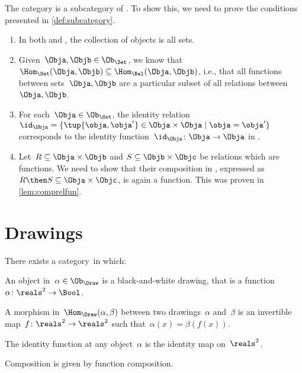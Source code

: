 \begin{example}
    The category \Set is a subcategory of \Rel. To show this, we need to prove the conditions presented in \cref{def:subcategory}.
    \begin{enumerate}
        \item In both \Rel and \Set, the collection of objects is all sets.
        \item Given~$\Obja,\Objb\in \Ob_{\Set}$, we know that~$\Hom_{\Set}(\Obja,\Objb)\subseteq \Hom_{\Rel}(\Obja,\Objb)$, i.e., that all functions between sets~$\Obja,\Objb$ are a particular subset of all relations between~$\Obja,\Objb$.
        \item For each~$\Obja \in \Ob_{\Set}$, the identity relation~$\id_\Obja=\{\tup{\obja,\obja'}\in \Obja\times \Obja \mid \obja=\obja'\}$ corresponds to the identity function~$\id_\Obja \colon \Obja \to \Obja$ in \Set.
        \item Let~$R\subseteq \Obja\times \Objb$ and $S\subseteq \Objb \times \Objc$ be relations which are functions. We need to show that their composition in \Rel, expressed as~$R\then S\subseteq \Obja\times \Objc$, is again a function. This was proven in \cref{lem:comprelfun}.
    \end{enumerate}

\end{example}


\section{Drawings}

\begin{definition}[Drawings]
    There exists a category~\Draw in which:
    \begin{compactenum}
        \item An object in~$\alpha\in \Ob_\Draw$ is a black-and-white drawing,
        that is a function~$\alpha \colon \reals^2 \to \Bool$.
        \item A morphism in~$\Hom_{\Draw}(\alpha, \beta)$ between two drawings~$\alpha$ and~$\beta$ is an invertible map~$f\colon \reals^2 \to \reals^2$ such that~$\alpha(x) = \beta(f(x))$.
        \item The identity function at any object~$\alpha$ is the identity map
        on~$\reals^2$.
        \item Composition is given by function composition.
    \end{compactenum}
\end{definition}

